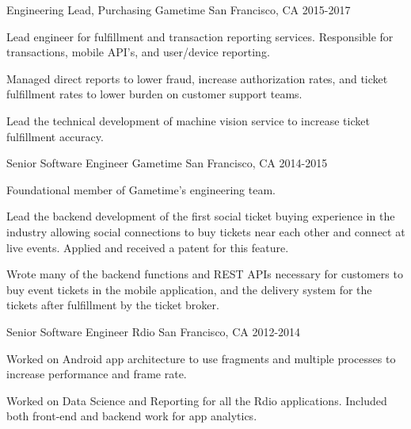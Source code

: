 \begin{cventries}
  \cventry
    {Engineering Lead, Purchasing} %
    {Gametime} %
    {San Francisco, CA} %
    {2015-2017} %
    {
      \begin{cvitems} %
        \item {Lead engineer for fulfillment and transaction reporting services. Responsible for transactions, mobile API's, and user/device reporting.}
        \item {Managed direct reports to lower fraud, increase authorization rates, and ticket fulfillment rates to lower burden on customer support teams.}
        \item {Lead the technical development of machine vision service to increase ticket fulfillment accuracy.}
      \end{cvitems}
    }

  \cventry
    {Senior Software Engineer} %
    {Gametime} %
    {San Francisco, CA} %
    {2014-2015} %
    {
      \begin{cvitems} %
        \item {Foundational member of Gametime's engineering team.}
        \item {Lead the backend development of the first social ticket buying experience in the industry allowing social connections to buy tickets near each other and connect at live events. Applied and received a patent for this feature.}
        \item {Wrote many of the backend functions and REST APIs necessary for customers to buy event tickets in the mobile application, and the delivery system for the tickets after fulfillment by the ticket broker.}
      \end{cvitems}
    }

  \cventry
    {Senior Software Engineer} %
    {Rdio} %
    {San Francisco, CA} %
    {2012-2014} %
    {
      \begin{cvitems} %
        \item {Worked on Android app architecture to use fragments and multiple processes to increase performance and frame rate.}
        \item {Worked on Data Science and Reporting for all the Rdio applications. Included both front-end and backend work for app analytics.}
      \end{cvitems}
    }

\end{cventries}
